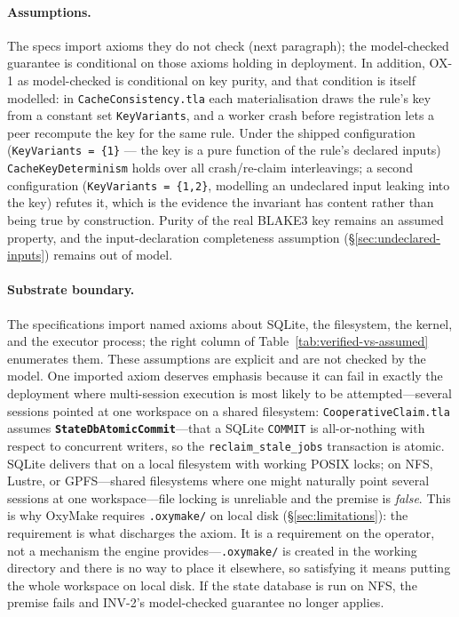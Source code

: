 \documentclass[12pt,a4paper]{article}
\newcommand{\code}[1]{{\texttt{\small\color{inlinecode}#1}}}
\begin{document}
\paragraph{Assumptions.}
The specs import axioms they do not check (next paragraph); the
model-checked guarantee is conditional on those axioms holding in
deployment. In addition, OX-1 as model-checked is conditional on key
purity, and that condition is itself modelled: in
\code{Cache\allowbreak Consistency.tla} each materialisation draws the
rule's key from a constant set \code{Key\allowbreak Variants}, and a
worker crash before registration lets a peer recompute the key for the
same rule. Under the shipped configuration
(\code{Key\allowbreak Variants = \{1\}} --- the key is a pure function
of the rule's declared inputs) \code{CacheKeyDeterminism} holds over
all crash/re-claim interleavings; a second configuration
(\code{Key\allowbreak Variants = \{1,2\}}, modelling an undeclared
input leaking into the key) refutes it, which is the evidence the
invariant has content rather than being true by construction. Purity
of the real BLAKE3 key remains an assumed property, and the
input-declaration completeness assumption
(\S\ref{sec:undeclared-inputs}) remains out of model.

\paragraph{Substrate boundary.}
The specifications import named axioms about SQLite, the filesystem,
the kernel, and the executor process; the right column of
Table~\ref{tab:verified-vs-assumed} enumerates them. These
assumptions are explicit and are not checked by the model.
One imported axiom deserves emphasis because it can fail in exactly
the deployment where multi-session execution is most likely to be
attempted---several sessions pointed at one workspace on a shared
filesystem:
\code{Cooperative\allowbreak Claim.tla} assumes
\textbf{\code{StateDbAtomicCommit}}---that a SQLite \code{COMMIT} is
all-or-nothing with respect to concurrent writers, so the
\code{reclaim\_stale\_jobs} transaction is atomic. SQLite delivers
that on a local filesystem with working POSIX locks; on NFS, Lustre,
or GPFS---shared filesystems where one might naturally point several
sessions at one workspace---file locking is unreliable and the premise
is \emph{false}. This is why OxyMake requires \code{.oxymake/} on
local disk (\S\ref{sec:limitations}): the requirement is what
discharges the axiom. It is a requirement on the operator, not a
mechanism the engine provides---\code{.oxymake/} is created in the
working directory and there is no way to place it elsewhere, so
satisfying it means putting the whole workspace on local disk. If the
state database is run on NFS, the premise fails and INV-2's
model-checked guarantee no longer applies.
\end{document}
